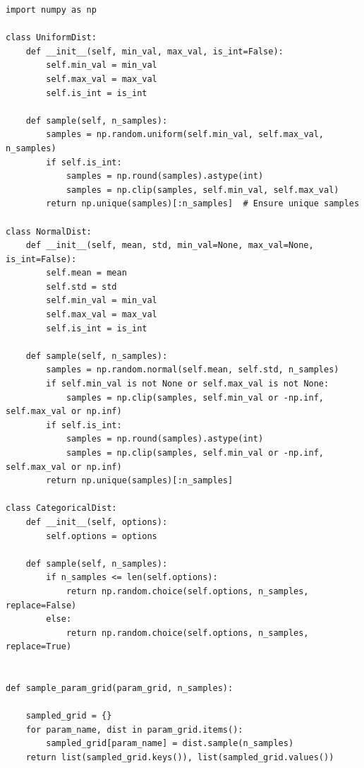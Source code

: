 \documentclass[journal]{IEEEtran}
\begin{document}
\begin{lstlisting}[style=python, caption={Random Variable Distribution Setup}, label={lst:distributions}]
import numpy as np

class UniformDist:
    def __init__(self, min_val, max_val, is_int=False):
        self.min_val = min_val
        self.max_val = max_val
        self.is_int = is_int

    def sample(self, n_samples):
        samples = np.random.uniform(self.min_val, self.max_val, n_samples)
        if self.is_int:
            samples = np.round(samples).astype(int)
            samples = np.clip(samples, self.min_val, self.max_val)
        return np.unique(samples)[:n_samples]  # Ensure unique samples

class NormalDist:
    def __init__(self, mean, std, min_val=None, max_val=None, is_int=False):
        self.mean = mean
        self.std = std
        self.min_val = min_val
        self.max_val = max_val
        self.is_int = is_int

    def sample(self, n_samples):
        samples = np.random.normal(self.mean, self.std, n_samples)
        if self.min_val is not None or self.max_val is not None:
            samples = np.clip(samples, self.min_val or -np.inf, self.max_val or np.inf)
        if self.is_int:
            samples = np.round(samples).astype(int)
            samples = np.clip(samples, self.min_val or -np.inf, self.max_val or np.inf)
        return np.unique(samples)[:n_samples]

class CategoricalDist:
    def __init__(self, options):
        self.options = options

    def sample(self, n_samples):
        if n_samples <= len(self.options):
            return np.random.choice(self.options, n_samples, replace=False)
        else:
            return np.random.choice(self.options, n_samples, replace=True)

    
def sample_param_grid(param_grid, n_samples):

    sampled_grid = {}
    for param_name, dist in param_grid.items():
        sampled_grid[param_name] = dist.sample(n_samples)
    return list(sampled_grid.keys()), list(sampled_grid.values())
\end{lstlisting}
\bigskip
\bigskip
\end{document}
